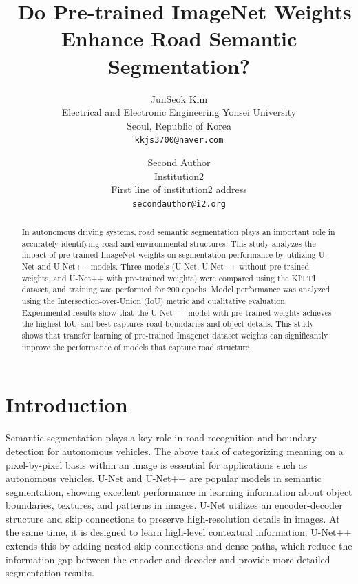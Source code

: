 \documentclass[10pt,twocolumn,letterpaper,final]{article} %
\begin{document}
\title{\ Do Pre-trained ImageNet Weights Enhance Road Semantic Segmentation?}

\author{JunSeok Kim\\
Electrical and Electronic Engineering
Yonsei University\\
Seoul, Republic of Korea
\\
{\tt\small kkjs3700@naver.com}
\and
Second Author\\
Institution2\\
First line of institution2 address\\
{\tt\small secondauthor@i2.org}
}
\maketitle

\begin{abstract}
   In autonomous driving systems, road semantic segmentation plays an important role in accurately identifying road and environmental structures. This study analyzes the impact of pre-trained ImageNet weights on segmentation performance by utilizing U-Net and U-Net++ models. Three models (U-Net, U-Net++ without pre-trained weights, and U-Net++ with pre-trained weights) were compared using the KITTI dataset, and training was performed for 200 epochs. Model performance was analyzed using the Intersection-over-Union (IoU) metric and qualitative evaluation. Experimental results show that the U-Net++ model with pre-trained weights achieves the highest IoU and best captures road boundaries and object details. This study shows that transfer learning of pre-trained Imagenet dataset weights can significantly improve the performance of models that capture road structure.
\end{abstract}

\section{Introduction}
\label{sec:intro}
Semantic segmentation plays a key role in road recognition and boundary detection for autonomous vehicles. The above task of categorizing meaning on a pixel-by-pixel basis within an image is essential for applications such as autonomous vehicles. 
U-Net and U-Net++ are popular models in semantic segmentation, showing excellent performance in learning information about object boundaries, textures, and patterns in images.
U-Net utilizes an encoder-decoder structure and skip connections to preserve high-resolution details in images. At the same time, it is designed to learn high-level contextual information. U-Net++ extends this by adding nested skip connections and dense paths, which reduce the information gap between the encoder and decoder and provide more detailed segmentation results.
\end{document}
